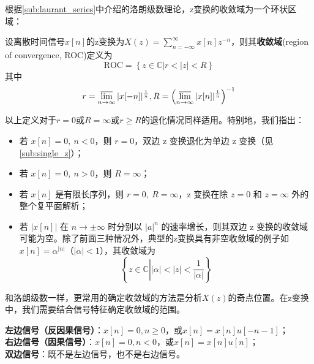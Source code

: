 \documentclass{ctexbook}
\begin{document}
根据\ref{sub:laurant_series}中介绍的洛朗级数理论，z变换的收敛域为一个环状区域：
\begin{definition}[z变换的收敛域]
    设离散时间信号$x[n]$的z变换为$X(z)=\sum_{n=-\infty}^{\infty}x[n]z^{-n}$，则其\textbf{收敛域}(region of convergence, ROC)定义为
    \[\text{ROC}=\left\{z\in\mathbb{C} \left|r<|z|<R\right.\right\}\]
    其中
    \[r=\varlimsup_{n\to\infty}|x[-n]|^{\frac{1}{n}},R=\left(\varlimsup_{n\to\infty}|x[n]|^{\frac{1}{n}}\right)^{-1}\]
\end{definition}
以上定义对于$r=0$或$R=\infty$或$r\geq R$的退化情况同样适用。特别地，我们指出：
\begin{itemize}
    \item 若 \( x[n] = 0,\ n < 0 \)，则 \( r = 0 \)，双边 z 变换退化为单边 z 变换（见\ref{sub:single_z}）；
    \item 若 \( x[n] = 0,\ n > 0 \)，则 \( R = \infty \)；
    \item 若 \( x[n] \) 是有限长序列，则 \( r = 0,\ R = \infty \)，z 变换在除 \( z = 0 \) 和 \( z = \infty \) 外的整个复平面解析；
    \item 若 \( |x[n]| \) 在 \( n \to \pm \infty \) 时分别以 \( |a|^n \) 的速率增长，则其双边 z 变换的收敛域可能为空。除了前面三种情况外，典型的z变换具有非空收敛域的例子如 \( x[n] = \alpha^{|n|} \)（\( |\alpha| < 1 \)），其收敛域为
     \[\left\{z\in\mathbb{C}\left| |\alpha| < |z| < \dfrac{1}{|\alpha|}\right. \right\}\]
\end{itemize}

和洛朗级数一样，更常用的确定收敛域的方法是分析$X(z)$的奇点位置。在z变换中，我们需要结合信号特征确定收敛域的范围。
\begin{definition}
    \textbf{左边信号（反因果信号）}：$x[n]=0,n\geq 0$，或$x[n]=x[n]u[-n-1]$；\\
    \textbf{右边信号（因果信号）}：$x[n]=0,n<0$，或$x[n]=x[n]u[n]$；\\
    \textbf{双边信号}：既不是左边信号，也不是右边信号。
\end{definition}
\end{document}
